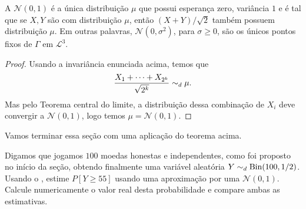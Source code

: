 \begin{corollary}
  A $\mathcal{N}(0,1)$ é a única distribuição $\mu$ que possui esperança zero, variância $1$ e é tal que se $X, Y$ são \iid com distribuição $\mu$, então $(X + Y)/\sqrt{2}$ também possuem distribuição $\mu$.
  Em outras palavras, $\mathcal{N}(0, \sigma^2)$, para $\sigma \geq 0$, são os únicos pontos fixos de $\Gamma$ em $\mathcal{L}^3$.
\end{corollary}

\begin{proof}
  Usando a invariância enunciada acima, temos que
  \begin{equation}
    \frac{X_1 + \dots + X_{2^k}}{\sqrt{2^k}} \sim_d \mu.
  \end{equation}
  Mas pelo Teorema central do limite, a distribuição dessa combinação de $X_i$ deve convergir a $\mathcal{N}(0,1)$, logo temos $\mu = \mathcal{N}(0,1)$.
\end{proof}

Vamos terminar essa seção com uma aplicação do teorema acima.

\begin{exercise}
  Digamos que jogamos $100$ moedas honestas e independentes, como foi proposto no início da seção, obtendo finalmente uma variável aleatória $Y \sim_d \operatorname{Bin}(100, 1/2)$.
  Usando o , estime $P[Y \geq 55]$ usando uma aproximação por uma $\mathcal{N}(0,1)$.
  Calcule numericamente o valor real desta probabilidade e compare ambas as estimativas.
\end{exercise}




